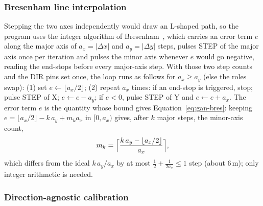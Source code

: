 \subsubsection{Bresenham line interpolation}

Stepping the two axes independently would draw an L-shaped path, so the program uses the integer algorithm of Bresenham~\cite{bresenham1965}, which carries an error term $e$ along the major axis of $a_x=|\Delta x|$ and $a_y=|\Delta y|$ steps, pulses STEP of the major axis once per iteration and pulses the minor axis whenever $e$ would go negative, reading the end-stops before every major-axis step.
With those two step counts and the DIR pins set once, the loop runs as follows for $a_x\ge a_y$ (else the roles swap): (1) set $e\leftarrow\lfloor a_x/2\rfloor$; (2) repeat $a_x$ times: if an end-stop is triggered, stop; pulse STEP of X; $e\leftarrow e-a_y$; if $e<0$, pulse STEP of Y and $e\leftarrow e+a_x$.
The error term $e$ is the quantity whose bound gives Equation~\ref{eq:gan-bres}: keeping $e=\lfloor a_x/2\rfloor-k\,a_y+m_ka_x$ in $[0,a_x)$ gives, after $k$ major steps, the minor-axis count,
\begin{equation}
m_k=\Bigl\lceil\frac{k\,a_y-\lfloor a_x/2\rfloor}{a_x}\Bigr\rceil,
\label{eq:gan-bres}
\end{equation}
which differs from the ideal $k\,a_y/a_x$ by at most $\tfrac12+\tfrac1{2a_x}\le1$ step (about 6\,\textmu m); only integer arithmetic is needed.

\subsubsection{Direction-agnostic calibration}
\label{sec:gan-calib}

